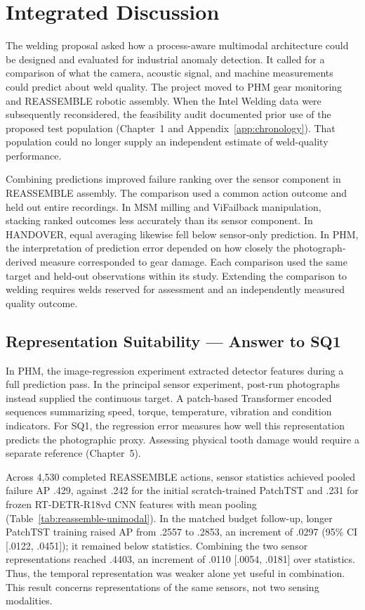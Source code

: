 \chapter{Integrated Discussion}
\label{ch:discussion}

The welding proposal asked how a process-aware multimodal architecture could be designed
and evaluated for industrial anomaly detection. It called for a comparison of what the
camera, acoustic signal, and machine measurements could predict about weld quality. The
project moved to PHM gear monitoring and REASSEMBLE robotic assembly. When the Intel
Welding data were subsequently reconsidered, the feasibility audit documented prior use
of the proposed test population (Chapter~1 and Appendix~\ref{app:chronology}). That
population could no longer supply an independent estimate of weld-quality performance.

Combining predictions improved failure ranking over the sensor component in REASSEMBLE
assembly. The comparison used a common action outcome and held out entire recordings. In
MSM milling and ViFailback manipulation, stacking ranked outcomes less accurately than
its sensor component. In HANDOVER, equal averaging likewise fell below sensor-only
prediction. In PHM, the interpretation of prediction error depended on how closely the
photograph-derived measure corresponded to gear damage. Each comparison used the same
target and held-out observations within its study. Extending the comparison to welding
requires welds reserved for assessment and an independently measured quality outcome.

\section{Representation Suitability --- Answer to SQ1}
In PHM, the image-regression experiment extracted detector features during a full
prediction pass. In the principal sensor experiment, post-run photographs instead
supplied the continuous target. A patch-based Transformer encoded sequences summarizing
speed, torque, temperature, vibration and condition indicators. For SQ1, the regression
error measures how well this representation predicts the photographic proxy. Assessing
physical tooth damage would require a separate reference (Chapter~5).

Across 4,530 completed REASSEMBLE actions, sensor statistics achieved pooled failure AP
.429, against .242 for the initial scratch-trained PatchTST and .231 for frozen
RT-DETR-R18vd CNN features with mean pooling (Table~\ref{tab:reassemble-unimodal}). In
the matched budget follow-up, longer PatchTST training raised AP from .2557 to .2853, an
increment of .0297 (95\% CI [.0122, .0451]); it remained below statistics. Combining the
two sensor representations reached .4403, an increment of .0110 [.0054, .0181] over
statistics. Thus, the temporal representation was weaker alone yet useful in
combination. This result concerns representations of the same sensors, not two sensing
modalities.

